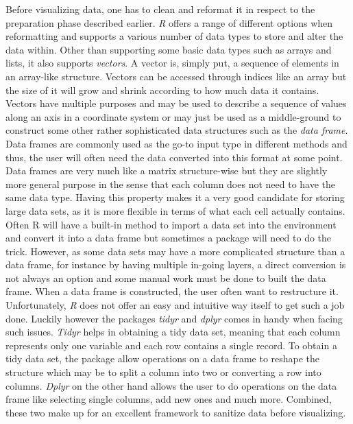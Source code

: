 \documentclass[Report.tex]{subfiles}
\begin{document}
 Before visualizing data, one has to clean and reformat it in respect to the preparation phase described earlier. \emph{R} offers a range of different options when reformatting and supports a various number of data  types to store and alter the data within. Other than supporting some basic data types such as arrays and lists, it also supports \emph{vectors}. A vector is, simply put, a sequence of elements in an array-like structure. Vectors can be accessed through indices like an array but the size of it will grow and shrink according to how much data it contains. Vectors have multiple purposes and may be used to describe a sequence of values along an axis in a coordinate system or may just be used as a middle-ground to construct some other rather sophisticated data structures such as the \emph{data frame}. Data frames are commonly used as the go-to input type in different methods and thus, the user will often need the data converted into this format at some point. Data frames are very much like a matrix structure-wise but they are slightly more general purpose in the sense that each column does not need to have the same data type. Having this property makes it a very good candidate for storing large data sets, as it is more flexible in terms of what each cell actually contains. Often R will have a built-in method to import a data set into the environment and convert it into a data frame but sometimes a package will need to do the trick. However, as some data sets may have a more complicated structure than a data frame, for instance by having multiple in-going layers, a direct conversion is not always an option and some manual work must be done to built the data frame. When a data frame is constructed, the user often want to restructure it. Unfortunately, \emph{R} does not offer an easy and intuitive way itself to get such a job done. Luckily however the packages \emph{tidyr} and  \emph{dplyr} comes in handy when facing such issues. \emph{Tidyr} helps in obtaining a tidy data set, meaning that each column represents only one variable and each row contains a single record. To obtain a tidy data set, the package allow operations on a data frame to reshape the structure which may be to split a column into two or converting a row into columns. \emph{Dplyr} on the other hand allows the user to do operations on the data frame like selecting single columns, add new ones and much more. Combined, these two make up for an excellent framework to sanitize data before visualizing.\\
 
\end{document}
